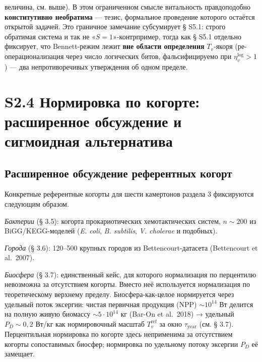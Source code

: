 \documentclass[pdflatex,sn-mathphys-ay]{sn-jnl}
\begin{document}
величина, см. выше). В этом ограниченном смысле витальность правдоподобно \textbf{конститутивно необратима} --- тезис, формальное проведение которого остаётся открытой задачей. Это граничное замечание субсумирует § S5.1: строго обратимая система и так не «\(S = 1\)»-контрпример, тогда как § S5.1 отдельно фиксирует, что Bennett-режим лежит \textbf{вне области определения} \(T_v\)-якоря (ре-операционализация через число логических битов, фальсифицируемо при \(\eta_v^{\text{log}} > 1\)) --- два непротиворечивых утверждения об одном пределе.

\section*{S2.4 Нормировка по когорте: расширенное обсуждение и сигмоидная альтернатива}\label{s2.4-ux43dux43eux440ux43cux438ux440ux43eux432ux43aux430-ux43fux43e-ux43aux43eux433ux43eux440ux442ux435-ux440ux430ux441ux448ux438ux440ux435ux43dux43dux43eux435-ux43eux431ux441ux443ux436ux434ux435ux43dux438ux435-ux438-ux441ux438ux433ux43cux43eux438ux434ux43dux430ux44f-ux430ux43bux44cux442ux435ux440ux43dux430ux442ux438ux432ux430}

\subsection*{Расширенное обсуждение референтных когорт}\label{ux440ux430ux441ux448ux438ux440ux435ux43dux43dux43eux435-ux43eux431ux441ux443ux436ux434ux435ux43dux438ux435-ux440ux435ux444ux435ux440ux435ux43dux442ux43dux44bux445-ux43aux43eux433ux43eux440ux442}

Конкретные референтные когорты для шести камертонов раздела 3 фиксируются следующим образом.

\emph{Бактерии} (§ 3.5): когорта прокариотических хемотактических систем, \(n \sim 200\) из BiGG/KEGG-моделей (\emph{E. coli}, \emph{B. subtilis}, \emph{V. cholerae} и подобных).

\emph{Города} (§ 3.6): 120--500 крупных городов из Bettencourt-датасета (Bettencourt et al.~2007).

\emph{Биосфера} (§ 3.7): единственный кейс, для которого нормализация по перцентилю невозможна за отсутствием когорты. Вместо неё используется нормализация по теоретическому верхнему пределу. Биосфера-как-целое нормируется через удельный поток эксергии: чистая первичная продукция (NPP) \(\sim 10^{14}\) Вт делится на полную живую биомассу \(\sim 5 \cdot 10^{14}\) кг (Bar-On et al.~2018) → удельный \(P_D \sim 0{,}2\) Вт/кг как нормировочный масштаб \(T_v^{\text{ref}}\) за окно \(\tau_{\text{year}}\) (см. § 3.7). Перцентильная нормировка по когорте здесь неприменима за отсутствием когорты сопоставимых биосфер; нормировка по удельному потоку эксергии \(P_D\) её замещает.
\end{document}
